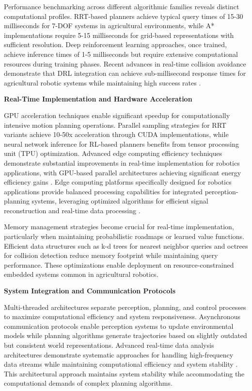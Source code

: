 \documentclass{ieeeaccess}
\begin{document}
Performance benchmarking across different algorithmic families reveals distinct computational profiles. RRT-based planners achieve typical query times of 15-30 milliseconds for 7-DOF systems in agricultural environments, while A* implementations require 5-15 milliseconds for grid-based representations with sufficient resolution. Deep reinforcement learning approaches, once trained, achieve inference times of 1-5 milliseconds but require extensive computational resources during training phases. Recent advances in real-time collision avoidance demonstrate that DRL integration can achieve sub-millisecond response times for agricultural robotic systems while maintaining high success rates .

\textbf{Real-Time Implementation and Hardware Acceleration}

GPU acceleration techniques enable significant speedup for computationally intensive motion planning operations. Parallel sampling strategies for RRT variants achieve 10-50x acceleration through CUDA implementations, while neural network inference for RL-based planners benefits from tensor processing unit (TPU) optimization. Advanced edge computing efficiency techniques demonstrate substantial improvements in real-time implementation for robotics applications, with GPU-based parallel architectures achieving significant energy efficiency gains \cite{9330509}. Edge computing platforms specifically designed for robotics applications provide balanced processing capabilities for integrated perception-planning systems, leveraging optimized algorithms for efficient signal reconstruction and real-time data processing \cite{10518056}.

Memory management strategies become crucial for real-time implementation, particularly when maintaining probabilistic roadmaps or learned value functions. Efficient data structures such as k-d trees for nearest neighbor queries and octrees for collision detection reduce memory footprint while maintaining query performance. These optimizations enable deployment on resource-constrained embedded systems common in agricultural robotics.

\textbf{System Integration and Communication Protocols}

Multi-threaded architectures separate perception, planning, and control processes to maximize computational efficiency and system responsiveness. Asynchronous communication protocols enable perception systems to update environmental models while planning algorithms generate trajectories based on slightly outdated but consistent world representations. Advanced real-time data analysis architectures demonstrate systematic approaches for handling high-frequency data streams while maintaining computational efficiency and system stability \cite{10497583}. This architectural approach maintains system stability while accommodating the computational demands of complex planning algorithms.
\end{document}
